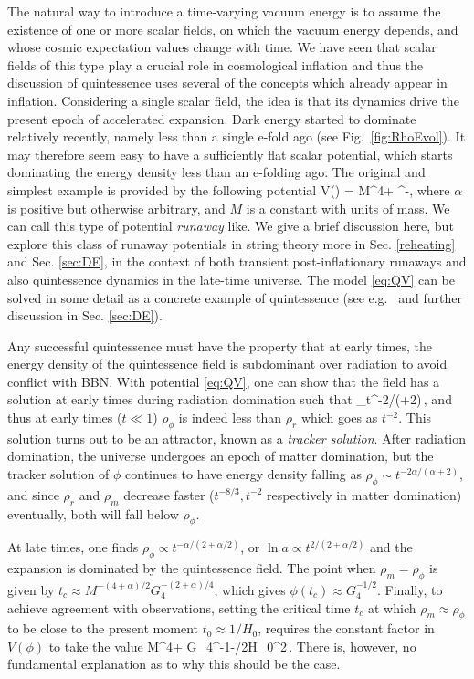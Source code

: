 The natural way to introduce a time-varying vacuum energy is to assume the existence of one or more scalar fields, on which the vacuum energy depends, and whose cosmic expectation values change with time. We have seen that scalar fields of this type  play a crucial role in cosmological inflation and thus the discussion of quintessence uses several of the concepts which already appear in inflation.
Considering a single scalar field, the idea is that its dynamics drive the present epoch of accelerated expansion. Dark energy started to dominate relatively recently, namely less than a single e-fold ago (see Fig.~\ref{fig:RhoEvol}). It may therefore seem easy to have a sufficiently flat scalar potential, which starts dominating the energy density less than an e-folding ago.
The original and simplest example is provided by the following potential \cite{Wetterich:1987fm,Peebles:1987ek,Ratra:1987rm}
\be
\label{eq:QV}
V(\phi) = M^{4+\alpha} \phi^{-\alpha},
\ee
where $\alpha$ is positive but otherwise arbitrary, and $M$ is a constant with units of mass. We can call this type of potential  {\em runaway} like. We give a brief discussion here, but explore this class of runaway potentials in string theory more in Sec. \ref{reheating} and Sec. \ref{sec:DE}, in the context of both transient post-inflationary runaways and also quintessence dynamics in the late-time universe. 
The model \eqref{eq:QV} can be solved in some detail as a concrete example of quintessence (see e.g.~\cite{Weinberg:2008zzc} and further discussion in Sec. \ref{sec:DE}).

Any successful quintessence must have the property that at early times, the energy density of the quintessence field is subdominant over radiation to avoid conflict with BBN. With potential \eqref{eq:QV}, one can show that the field has a solution at early times during radiation domination such that
\be
\rho_\phi\propto t^{-2\alpha/(\alpha+2)}\,,
\ee
and thus at early times ($t\ll 1$) $\rho_\phi$ is indeed less than $\rho_r$ which goes as $t^{-2}$. This solution turns out 
to be an attractor, known as a {\em tracker solution}. After radiation domination, the universe undergoes an epoch of matter domination, but the tracker solution of $\phi$ continues to have energy density falling as $\rho_\phi\sim t^{-2\alpha/(\alpha+2)}$, and since $\rho_r$ and $\rho_m$ decrease faster ($t^{-8/3}, t^{-2}$ respectively in matter domination) eventually, both will fall below $\rho_\phi$. 

At late times, 
one finds $\rho_\phi\propto t^{-\alpha/(2+\alpha/2)}$, or $\ln a \propto t^{2/(2+\alpha/2)}$ and the expansion is  dominated by the quintessence field.  The point when $\rho_m=\rho_\phi$ is given by
$t_c\approx M^{-(4+\alpha)/2}G_4^{-(2+\alpha)/4}$, which gives $\phi(t_c)\approx G_4^{-1/2}$. 
Finally, to achieve agreement with observations, setting the critical time $t_c$ at which $\rho_m\approx \rho_\phi$ to be close to the present moment $t_0 \approx 1/H_0$,  requires the constant factor in $V(\phi)$ to take the value
\be
M^{4+\alpha} \approx G_4^{-1-\alpha/2}H_0^2\,.
\ee
There is, however, no fundamental explanation as to why this should be the case.

